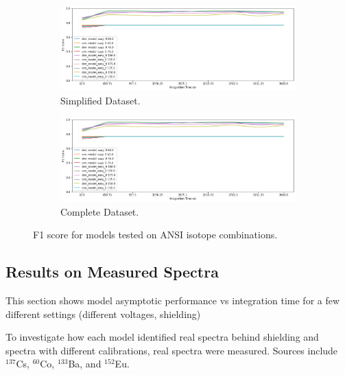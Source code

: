 \begin{figure}[H]
     \centering
     \begin{subfigure}[b]{0.9\textwidth}
         \centering
         \includegraphics[width=\textwidth]{images/results_easy_distance_comparison}
         \caption{Simplified Dataset.}
         \label{fig:results_full_background_inject_simple}
     \end{subfigure}

     \begin{subfigure}[b]{0.9\textwidth}
         \centering
         \includegraphics[width=\textwidth]{images/results_easy_distance_comparison}
         \caption{Complete Dataset.}
         \label{fig:results_full_background_inject_full}
     \end{subfigure}

        \caption{F1 score for models tested on ANSI isotope combinations.}
        \label{fig:results_full_background_inject}
\end{figure}



\subsection{Results on Measured Spectra}

This section shows model asymptotic performance vs integration time for a few different settings (different voltages, shielding)

To investigate how each model identified real spectra behind shielding and spectra with different calibrations, real spectra were measured. Sources include $^{137}$Cs, $^{60}$Co, $^{133}$Ba, and $^{152}$Eu. 


